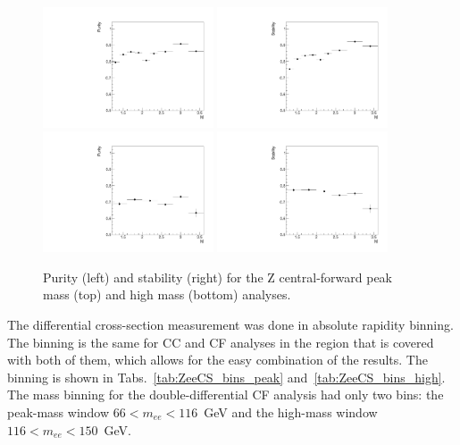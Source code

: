 \begin{figure}
  \centering
  \includegraphics[width=0.45\textwidth]{figures/ZCF_purity_peak}
  \includegraphics[width=0.45\textwidth]{figures/ZCF_stability_peak} \\
  \includegraphics[width=0.45\textwidth]{figures/ZCF_purity_high}
  \includegraphics[width=0.45\textwidth]{figures/ZCF_stability_high} \\
  \caption{Purity (left) and stability (right) for the Z central-forward peak mass (top) and high mass (bottom) analyses.}
  \label{fig:ZeeCS_purity_stability}
\end{figure}

The differential cross-section measurement was done in absolute rapidity binning.
The binning is the same for CC and CF analyses in the region that is covered with both of them, which allows for the easy combination of the results. The binning is shown in Tabs.~\ref{tab:ZeeCS_bins_peak} and~\ref{tab:ZeeCS_bins_high}. The mass binning for the double-differential CF analysis had only two bins: the peak-mass window $66 < m_{ee} < 116$~GeV and the high-mass window $116 < m_{ee} < 150$~GeV.

